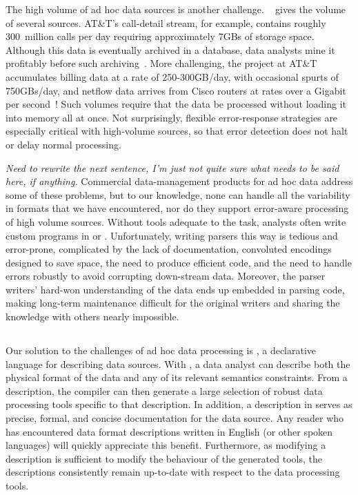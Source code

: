 The high volume of ad hoc data sources is another challenge.
~ gives the volume of several sources.
AT\&T's call-detail stream, for example, contains roughly 300~million
calls per day requiring approximately 7GBs of storage space.  Although
this data is eventually archived in a database, data analysts mine it
profitably before such archiving~\cite{kdd98,kdd99}.  More
challenging, the \ningaui{} project at AT\&T accumulates billing data
at a rate of 250-300GB/day, with occasional spurts of 750GBs/day, and
netflow data arrives from Cisco routers at rates over a Gigabit per
second~\cite{gigascope}!  Such volumes require that the data be
processed without loading it into memory all at once.  Not
surprisingly, flexible error-response strategies are especially
critical with high-volume sources, so that error detection does not
halt or delay normal processing.


{\em Need to rewrite the next sentence, I'm just not quite sure what
  needs to be said here, if anything.}  Commercial data-management
products for ad hoc data address some of these problems, but to our
knowledge, none can handle all the variability in formats that we have
encountered, nor do they support error-aware processing of high volume
sources.  Without tools adequate to the task, analysts often write
custom programs in \C{} or \perl{}.  Unfortunately, writing parsers
this way is tedious and error-prone, complicated by the lack of
documentation, convoluted encodings designed to save space, the need
to produce efficient code, and the need to handle errors robustly to
avoid corrupting down-stream data.  Moreover, the parser writers'
hard-won understanding of the data ends up embedded in parsing code,
making long-term maintenance difficult for the original writers and
sharing the knowledge with others nearly impossible.

\subsection{\padsmlbig{}}

Our solution to the challenges of ad hoc data processing is \padsml{},
a declarative language for describing data sources. With \padsml{}, a
data analyst can describe both the physical format of the data and any
of its relevant semantics constraints. From a description, the
\padsml{} compiler can then generate a large selection of robust data
processing tools specific to that description. In addition, a
description in \padsml{} serves as precise, formal, and concise
documentation for the data source.  Any reader who has encountered
data format descriptions written in English (or other spoken
languages) will quickly appreciate this benefit. Furthermore, as
modifying a description is sufficient to modify the behaviour of the
generated tools, the descriptions consistently remain up-to-date with
respect to the data processing tools.


